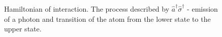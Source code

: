\begin{figure}
\centering



\caption{Hamiltonian of interaction. The process described by $\hat{a}^{\dag}\hat{\sigma}^{\dag}$ - emission
  of a photon and transition of the atom from the lower state to the upper state.}
\label{figPart1Ch2_2_4}
\end{figure}